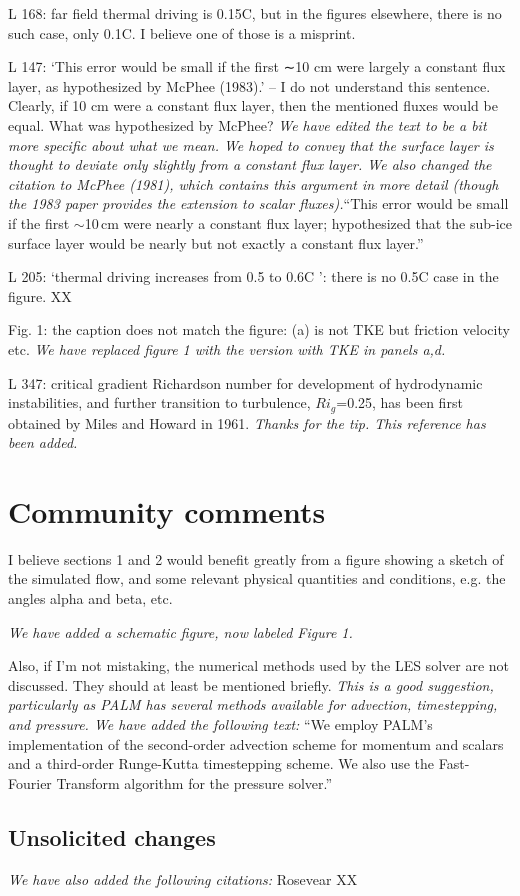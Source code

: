 \documentclass[tc, manuscript]{copernicus}
\begin{document}
L 168: far field thermal driving is 0.15C, but in the figures elsewhere, there is no such case, only 0.1C. I believe one of those is a misprint.

L 147: ‘This error would be small if the first ∼10 cm were largely a constant flux layer, as hypothesized by McPhee (1983).’ – I do not understand this sentence. Clearly, if 10 cm were a constant flux layer, then the mentioned fluxes would be equal. What was hypothesized by McPhee?
\textit{We have edited the text to be a bit more specific about what we mean. We hoped to convey that the surface layer is thought to deviate only slightly from a constant flux layer. We also changed the citation to McPhee (1981), which contains this argument in more detail (though the 1983 paper provides the extension to scalar fluxes).}``This error would be small if the first $\sim$10\,\unit{cm} were nearly a constant flux layer; \citet{mcphee_analytic_1981} hypothesized that the sub-ice surface layer would be nearly but not exactly a constant flux layer.''

L 205: ‘thermal driving increases from 0.5 to 0.6C ’: there is no 0.5C case in the figure.
XX

Fig. 1: the caption does not match the figure: (a) is not TKE but friction velocity etc.
\textit{We have replaced figure 1 with the version with TKE in panels a,d.}

L 347: critical gradient Richardson number for development of hydrodynamic instabilities, and further transition to turbulence, $Ri_g$=0.25, has been first obtained by Miles and Howard in 1961.
\textit{Thanks for the tip. This reference has been added.}

\section{Community comments}
I believe sections 1 and 2 would benefit greatly from a figure showing a sketch of the simulated flow, and some relevant physical quantities and conditions, e.g. the angles alpha and beta, etc.

\textit{We have added a schematic figure, now labeled Figure 1.}

Also, if I'm not mistaking, the numerical methods used by the LES solver are not discussed. They should at least be mentioned briefly.
\textit{This is a good suggestion, particularly as PALM has several methods available for advection, timestepping, and pressure. We have added the following text:}
``We employ PALM's implementation of the \citet{piacsek_conservation_1970} second-order advection scheme for momentum and scalars and a third-order Runge-Kutta timestepping scheme. We also use the \citet{temperton_generalized_1992} Fast-Fourier Transform algorithm for the pressure solver.''

\subsection{Unsolicited changes}
\textit{We have also added the following citations:}
Rosevear XX
\end{document}
